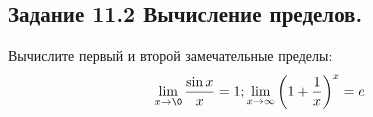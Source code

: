 \subsection*{\textbf{Задание 11.2} Вычисление пределов.}
Вычислите первый и второй замечательные пределы:
\[
    \lim_{x\to\0}\frac{\sin x}{x} = 1 ;
    \lim_{x\to\infty}\left(1+\frac{1}{x}\right)^x = e
\]

\begin{figure}[H]
    \renewcommand{\figurename}{Рисунок}
    \label{fig:image_2}
\end{figure}